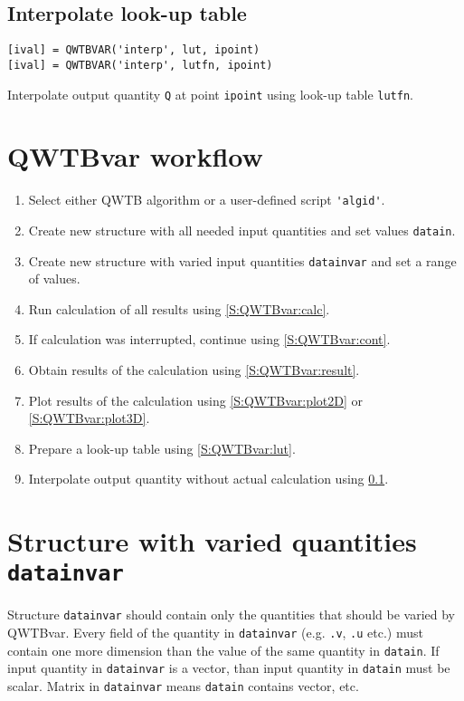 \documentclass[12pt,a4paper,oneside]{report} %
\newcommand{\li}[1]{\lstinline{#1}}     %
\begin{document}
\subsection{Interpolate look-up table}
\label{S:QWTBvar:interp}
\begin{lstlisting}
[ival] = QWTBVAR('interp', lut, ipoint)
[ival] = QWTBVAR('interp', lutfn, ipoint)
\end{lstlisting}
Interpolate output quantity \li{Q} at point \li{ipoint} using
look-up table \li{lutfn}.

\section{QWTBvar workflow}
\begin{enumerate}
    \item Select either QWTB algorithm or a user-defined script \li{'algid'}.
    \item Create new structure with all needed input quantities and set values \li{datain}.
    \item Create new structure with varied input quantities \li{datainvar} and set a range of values.
    \item Run calculation of all results using \ref{S:QWTBvar:calc}.
    \item If calculation was interrupted, continue using \ref{S:QWTBvar:cont}.
    \item Obtain results of the calculation using \ref{S:QWTBvar:result}.
    \item Plot results of the calculation using \ref{S:QWTBvar:plot2D} or \ref{S:QWTBvar:plot3D}.
    \item Prepare a look-up table using \ref{S:QWTBvar:lut}.
    \item Interpolate output quantity without actual calculation using \ref{S:QWTBvar:interp}.
\end{enumerate}

\section{Structure with varied quantities \tt datainvar}
\label{S:QWTBvar:datainvar}
Structure \li{datainvar} should contain only the quantities that should be varied by QWTBvar.
Every field of the quantity in
\li{datainvar} (e.g. \li{.v}, \li{.u} etc.) must contain
one more dimension than the value of the same quantity in \li{datain}. If
input quantity in \li{datainvar} is a vector, than input quantity in
\li{datain} must be scalar. Matrix in \li{datainvar} means
\li{datain} contains vector, etc.
\end{document}
